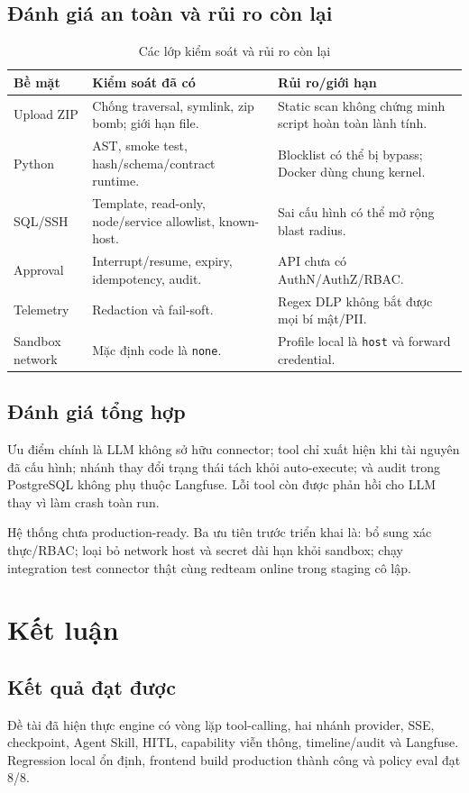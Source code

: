 \documentclass[12pt,a4paper]{article}
\begin{document}
\subsection{Đánh giá an toàn và rủi ro còn lại}
\begin{longtable}{p{}p{}p{}}
\caption{Các lớp kiểm soát và rủi ro còn lại}\label{tab:security-eval}\\
\toprule
\textbf{Bề mặt} & \textbf{Kiểm soát đã có} & \textbf{Rủi ro/giới hạn} \\
\midrule
Upload ZIP & Chống traversal, symlink, zip bomb; giới hạn file. & Static scan không chứng minh script hoàn toàn lành tính. \\
Python & AST, smoke test, hash/schema/contract runtime. & Blocklist có thể bị bypass; Docker dùng chung kernel. \\
SQL/SSH & Template, read-only, node/service allowlist, known-host. & Sai cấu hình có thể mở rộng blast radius. \\
Approval & Interrupt/resume, expiry, idempotency, audit. & API chưa có AuthN/AuthZ/RBAC. \\
Telemetry & Redaction và fail-soft. & Regex DLP không bắt được mọi bí mật/PII. \\
Sandbox network & Mặc định code là \texttt{none}. & Profile local là \texttt{host} và forward credential. \\
\bottomrule
\end{longtable}

\subsection{Đánh giá tổng hợp}
Ưu điểm chính là LLM không sở hữu connector; tool chỉ xuất hiện khi tài nguyên đã cấu hình; nhánh thay đổi trạng thái tách khỏi auto-execute; và audit trong PostgreSQL không phụ thuộc Langfuse. Lỗi tool còn được phản hồi cho LLM thay vì làm crash toàn run.

Hệ thống chưa production-ready. Ba ưu tiên trước triển khai là: bổ sung xác thực/RBAC; loại bỏ network host và secret dài hạn khỏi sandbox; chạy integration test connector thật cùng redteam online trong staging cô lập.

\clearpage
\section{Kết luận}

\subsection{Kết quả đạt được}
Đề tài đã hiện thực engine có vòng lặp tool-calling, hai nhánh provider, SSE, checkpoint, Agent Skill, HITL, capability viễn thông, timeline/audit và Langfuse. Regression local ổn định, frontend build production thành công và policy eval đạt 8/8.
\end{document}
